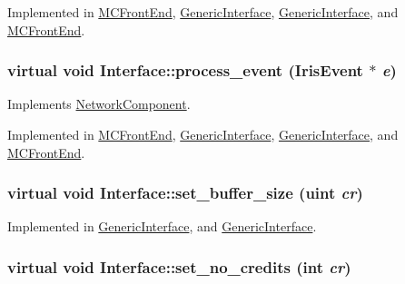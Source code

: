 Implemented in \hyperlink{classMCFrontEnd_38750cc156a8b88225c58b1c08e4f83e}{MCFrontEnd}, \hyperlink{classGenericInterface_b1be26f08d69932b1ac08094985eb5d6}{GenericInterface}, \hyperlink{classGenericInterface_b1be26f08d69932b1ac08094985eb5d6}{GenericInterface}, and \hyperlink{classMCFrontEnd_38750cc156a8b88225c58b1c08e4f83e}{MCFrontEnd}.\hypertarget{classInterface_baaaeb823b1e0fd7ddc1bb32c2f016fb}{
\subsubsection[{process\_\-event}]{\setlength{\rightskip}{0pt plus 5cm}virtual void Interface::process\_\-event ({\bf IrisEvent} $\ast$ {\em e})}}
\label{classInterface_baaaeb823b1e0fd7ddc1bb32c2f016fb}




Implements \hyperlink{classNetworkComponent_c93793eea1e2d424abe86e110ca8b399}{NetworkComponent}.

Implemented in \hyperlink{classMCFrontEnd_cc935494693a9b02addf8ea8c04f81b3}{MCFrontEnd}, \hyperlink{classGenericInterface_d56b8876204889d3c096fccd61b16b9e}{GenericInterface}, \hyperlink{classGenericInterface_d56b8876204889d3c096fccd61b16b9e}{GenericInterface}, and \hyperlink{classMCFrontEnd_cc935494693a9b02addf8ea8c04f81b3}{MCFrontEnd}.\hypertarget{classInterface_f2cec7f7aa725d52c8bb02087d7c9e5d}{
\subsubsection[{set\_\-buffer\_\-size}]{\setlength{\rightskip}{0pt plus 5cm}virtual void Interface::set\_\-buffer\_\-size ({\bf uint} {\em cr})}}
\label{classInterface_f2cec7f7aa725d52c8bb02087d7c9e5d}




Implemented in \hyperlink{classGenericInterface_fd1cd1ccd6d355852bee1677cd8b56df}{GenericInterface}, and \hyperlink{classGenericInterface_fd1cd1ccd6d355852bee1677cd8b56df}{GenericInterface}.\hypertarget{classInterface_c458ee6d8e974cb0a9f90308d0feb16d}{
\subsubsection[{set\_\-no\_\-credits}]{\setlength{\rightskip}{0pt plus 5cm}virtual void Interface::set\_\-no\_\-credits (int {\em cr})}}
\label{classInterface_c458ee6d8e974cb0a9f90308d0feb16d}




